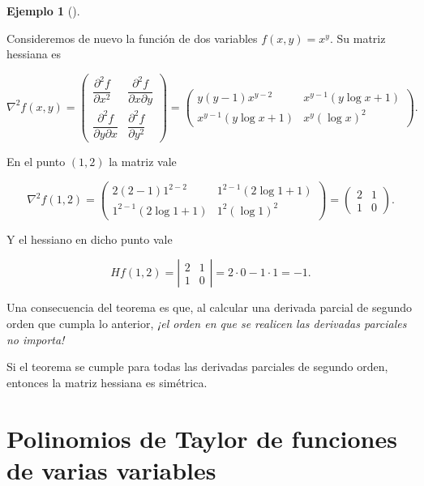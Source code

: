 \documentclass[
  a4paper,
]{scrreport}
\theoremstyle{plain}
\theoremstyle{plain}
\theoremstyle{definition}
\theoremstyle{definition}
\newtheorem{example}{Ejemplo}[chapter]
\theoremstyle{plain}
\theoremstyle{definition}
\theoremstyle{remark}
\begin{document}
\begin{example}[]\protect\hypertarget{exm-matriz-hessiana}{}\label{exm-matriz-hessiana}

Consideremos de nuevo la función de dos variables \(f(x,y)=x^y\). Su
matriz hessiana es

\[\nabla^2f(x,y)=\left(
\begin{array}{cc}
\dfrac{\partial^2 f}{\partial x^2} & \dfrac{\partial^2 f}{\partial x \partial y}\\
\dfrac{\partial^2 f}{\partial y \partial x} & \dfrac{\partial^2 f}{\partial y^2}
\end{array}
\right)
=
\left(
\begin{array}{cc}
y(y-1)x^{y-2} & x^{y-1}(y\log x+1) \\
x^{y-1}(y\log x+1) & x^y(\log x)^2
\end{array}
\right).\]

En el punto \((1,2)\) la matriz vale

\[\nabla^2f(1,2)=\left(
\begin{array}{cc}
2(2-1)1^{2-2} & 1^{2-1}(2\log 1+1) \\
1^{2-1}(2\log 1+1) & 1^2(\log 1)^2
\end{array}
\right)
=
\left(
\begin{array}{cc}
2 & 1 \\
1 & 0
\end{array}
\right).\]

Y el hessiano en dicho punto vale

\[Hf(1,2)=\left|
\begin{array}{cc}
2 & 1 \\
1 & 0
\end{array}
\right|=
2\cdot 0-1\cdot1= -1.
\]

\end{example}

Una consecuencia del teorema es que, al calcular una derivada parcial de
segundo orden que cumpla lo anterior, \emph{¡el orden en que se realicen
las derivadas parciales no importa!}

Si el teorema se cumple para todas las derivadas parciales de segundo
orden, entonces la matriz hessiana es simétrica.

\hypertarget{polinomios-de-taylor-de-funciones-de-varias-variables}{%
\section{Polinomios de Taylor de funciones de varias
variables}\label{polinomios-de-taylor-de-funciones-de-varias-variables}}
\end{document}
